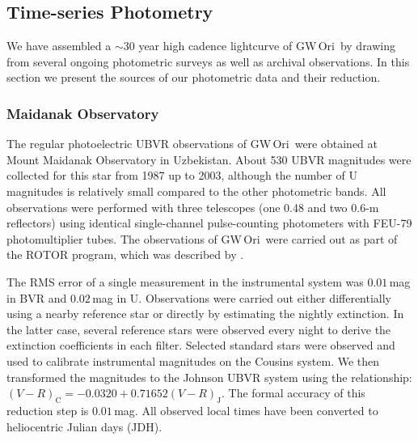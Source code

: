 \documentclass[twocolumn]{aastex61}
\newcommand{\obj}{GW\,Ori}
\begin{document}
\subsection{Time-series Photometry}
We have assembled a $\sim$30 year high cadence lightcurve of \obj\ by drawing from several ongoing photometric surveys as well as archival observations. In this section we present the sources of our photometric data and their reduction.

\subsubsection{Maidanak Observatory}
The regular photoelectric UBVR observations of \obj\ were obtained at Mount Maidanak Observatory in Uzbekistan. About 530 UBVR magnitudes were collected for this star from 1987 up to 2003, although the number of U magnitudes is relatively small compared to the other photometric bands.
All observations were performed with three telescopes (one 0.48 and two 0.6-m reflectors) using identical single-channel pulse-counting photometers with FEU-79 photomultiplier tubes. The observations of \obj\ were carried out as part of the ROTOR program, which was described by \citet{shevchenko93}.

The RMS error of a single measurement in the instrumental system was $0.01$\,mag in BVR and $0.02$\,mag in U. Observations were carried out either differentially using a nearby reference star or directly by estimating the nightly extinction.
In the latter case, several reference stars were observed every night to derive the extinction coefficients in each filter. Selected standard stars were observed and used to calibrate instrumental magnitudes on the Cousins system. We then transformed the magnitudes to the Johnson
UBVR system using the relationship: $(V-R)_\mathrm{C} = -0.0320 + 0.71652(V-R)_\mathrm{J}$.
The formal accuracy of this reduction step is $0.01\,$mag. All observed local times have been converted to heliocentric Julian days (JDH).
\end{document}
